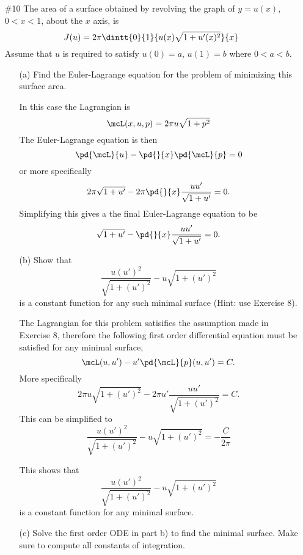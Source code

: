 \documentclass[11pt, oneside]{article}
\begin{document}
\begin{enumerate}
  \pagebreak
  \item[\#10]
    The area of a surface obtained by revolving the graph of $y = u(x)$,
    $0 < x < 1$, about the $x$ axis, is
    \[
      J(u) = 2\pi \dintt{0}{1}{u(x) \sqrt{1 + u'(x)^2}}{x}
    \]
    Assume that $u$ is required to satisfy $u(0) = a$, $u(1) = b$ where
    $0 < a < b$.
    \begin{enumerate}
      \item[(a)] %
        Find the Euler-Lagrange equation for the problem of minimizing this surface area.

        In this case the Lagrangian is
        \[
          \mcL(x, u, p) = 2\pi u \sqrt{1 + p^2}
        \]
        The Euler-Lagrange equation is then
        \[
          \pd{\mcL}{u} - \pd{}{x} \pd{\mcL}{p} = 0
        \]
        or more specifically
        \[
          2\pi \sqrt{1 + u'} - 2\pi \pd{}{x} \frac{uu'}{\sqrt{1 + u'}} = 0.
        \]
        Simplifying this gives a the final Euler-Lagrange equation to be
        \[
          \sqrt{1 + u'} - \pd{}{x} \frac{uu'}{\sqrt{1 + u'}} = 0.
        \]

      \item[(b)] %
        Show that
        \[
          \frac{u(u')^2}{\sqrt{1 + (u')^2}} - u\sqrt{1 + (u')^2}
        \]
        is a constant function for any such minimal surface (Hint: use Exercise 8).

        The Lagrangian for this problem satisifies the assumption made in
        Exercise 8, therefore the following first order differential equation
        must be satisfied for any minimal surface,
        \[
          \mcL(u, u') - u' \pd{\mcL}{p}(u, u') = C.
        \]
        More specifically
        \[
          2\pi u\sqrt{1 + (u')^2} - 2\pi u' \frac{uu'}{\sqrt{1 + (u')^2}} = C.
        \]
        This can be simplified to 
        \[
          \frac{u(u')^2}{\sqrt{1 + (u')^2}} - u\sqrt{1 + (u')^2} = -\frac{C}{2\pi}
        \]

        This shows that
        \[
          \frac{u(u')^2}{\sqrt{1 + (u')^2}} - u\sqrt{1 + (u')^2}
        \]
        is a constant function for any minimal surface.

      \item[(c)]
        Solve the first order ODE in part b) to find the minimal surface.
        Make sure to compute all constants of integration.


\end{enumerate}
\end{enumerate}
\end{document}
